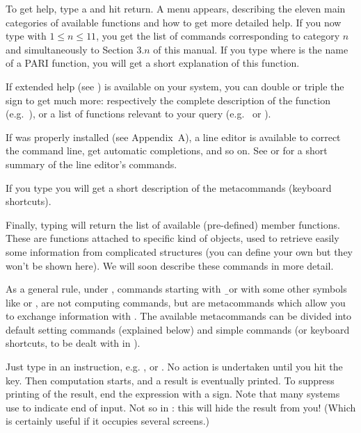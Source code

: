 
To get help, type a  and hit return. A menu appears, describing the
eleven main categories of available functions and how to get more detailed
help. If you now type  with $1\le n\le11$, you get the list of
commands corresponding to category $n$ and simultaneously to Section $3.n$ of
this manual. If you type  where 
is the name of a PARI function, you will get a short explanation of this
function.

If extended help (see ) is available on your system,
you can double or triple the  sign to get much more: respectively the
complete description of the function (e.g.~), or a list of
 functions relevant to your query (e.g.~ 
or ).

If  was properly installed (see Appendix~A), a line editor is
available to correct the command line, get automatic completions, and so on.
See  or  for a short summary of the line
editor's commands.

If you type  you will get a short description of the metacommands
(keyboard shortcuts).

Finally, typing  will return the list of available (pre-defined)
member functions. These are functions attached to specific kind of objects,
used to retrieve easily some information from complicated structures (you can
define your own but they won't be shown here). We will soon describe these
commands in more detail.

As a general rule, under , commands starting with \b\ or with some
other symbols like  or \kbd{\#}, are not computing commands, but are
metacommands which allow you to exchange information with . The
available metacommands can be divided into default setting commands
(explained below) and simple commands (or keyboard shortcuts, to be dealt
with in ).


Just type in an instruction, e.g. , or . No action is
undertaken until you hit the  key. Then computation starts, and
a result is eventually printed. To suppress printing of the result, end the
expression with a \kbd{;} sign. Note that many systems use \kbd{;} to
indicate end of input. Not so in : this will hide the result from you!
(Which is certainly useful if it occupies several screens.)

